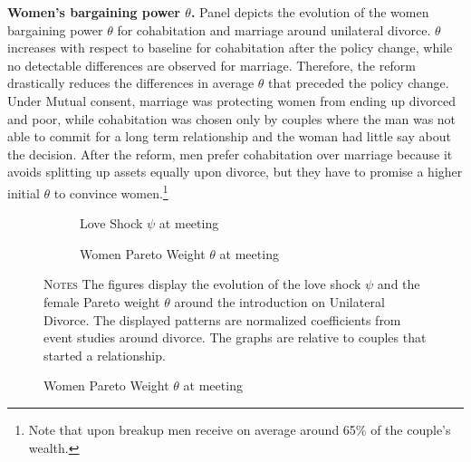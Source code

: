 \documentclass[12pt]{article}
\numberwithin{table}{section}
\begin{document}
\textbf{Women's bargaining power $\theta$.} Panel  depicts the evolution of the women bargaining power $\theta$ for cohabitation and marriage around unilateral divorce. $\theta$ increases with respect to baseline for cohabitation after the policy change, while no detectable differences are observed for marriage. Therefore, the reform drastically reduces the differences in average $\theta$ that preceded the policy change.  Under Mutual consent, marriage was protecting women from ending up divorced and poor, while cohabitation was chosen only by couples where the man was not able to commit for a long term relationship and the woman had little say about the decision. After the reform, men prefer cohabitation over marriage because it avoids splitting up assets equally upon divorce, but they have to promise a higher initial $\theta$ to convince women.\footnote{Note that upon breakup men receive on average around 65\% of the couple's wealth.}


\begin{figure}[H]
\begin{center}
\caption{\\ Event Studies Around the introduction of Unilateral Divorce--Simulated Data}
\label{fig:fis2g}
\begin{subfigure}{.49\textwidth}
\centering
\caption{Love Shock $\psi$ at meeting}
\label{sf:sub-first}
\scalebox{0.5}{ } 
\end{subfigure}
\begin{subfigure}{.49\textwidth}
\centering
\caption{Women Pareto Weight $\theta$ at meeting}
\label{sf:sub-second}
\scalebox{0.5}{ } 
\end{subfigure}
\end{center}


\begin{minipage}{0.99\textwidth} %
{\footnotesize \textsc{Notes} The figures display the evolution of the love shock $\psi$ and the female Pareto weight $\theta$ around the introduction on Unilateral Divorce. The displayed patterns are normalized coefficients from event studies around divorce. The graphs are relative to couples that started a relationship.  \par}
\end{minipage}
\end{figure}
\FloatBarrier
\end{document}
